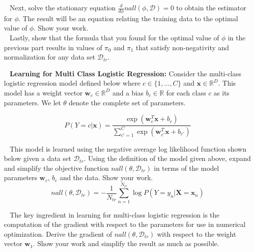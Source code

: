 \documentclass[11pt]{article}
\newcommand{\mbf}[1]{{\mathbf{#1}}}
\begin{document}
\begin{problem}{30}
~ Next, solve the stationary equation $\frac{d}{d\phi} nall(\phi,\mathcal{D})=0$ to obtain the estimator for $\phi$. The result will be an equation relating the training data to the optimal value of $\phi$. Show your work. \\

~ Lastly, show that the formula that you found for the optimal value of $\phi$ in the previous part results in values of $\pi_0$ and $\pi_1$ that satisfy non-negativity and normalization for any data set $\mathcal{D}_{tr}$. 

\end{problem}

\begin{problem}{10}~ \textbf{Learning for Multi Class Logistic Regression:} Consider the multi-class logistic regression model defined below where $c\in \{1,...,C\}$ and $\mbf{x}\in\mathbb{R}^D$. This model has a weight vector $\mbf{w}_c\in\mathbb{R}^D$ and a bias $b_c\in\mathbb{R}$ for each class $c$ as its parameters. We let $\theta$ denote the complete set of parameters.  

$$P(Y=c|\mbf{x}) = \frac{\exp(\mbf{w}_c^T\mbf{x}+b_c)}{\sum_{c'=1}^C \exp(\mbf{w}_{c'}^T\mbf{x}+b_{c'}) } $$

~ This model is learned using the negative average log likelihood function shown below given a data set $\mathcal{D}_{tr}$. Using the definition of the model given above, expand and simplify the objective function $nall(\theta,\mathcal{D}_{tr})$ in terms of the model parameters $\mbf{w}_c$, $b_c$ and the data. Show your work. 
\begin{equation*}
    nall(\theta,\mathcal{D}_{tr})=-\frac{1}{N_{tr}}\sum_{n=1}^{N_{tr}} \log P(Y=y_n | \mbf{X}=\mbf{x}_n)
\end{equation*}

~ The key ingredient in learning for multi-class logistic regression is the computation of the gradient with respect to the parameters for use in numerical optimization. Derive the gradient of $nall(\theta,\mathcal{D}_{tr})$ with respect to the weight vector $\mbf{w}_1$. Show your work and simplify the result as much as possible.\\

\end{problem}
\end{document}

